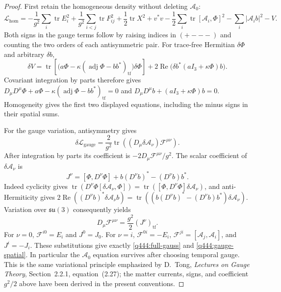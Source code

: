 \begin{proof}
First retain the homogeneous density without deleting $\mathcal A_0$:
\[
 \mathcal L_{\mathrm{hom}}
 =-\frac1{g^2}\sum_i\operatorname{tr}E_i^2
   +\frac1{g^2}\sum_{i<j}\operatorname{tr}F_{ij}^2
   +\frac12\operatorname{tr}X^2+v^*v
   -\frac12\sum_i\operatorname{tr}[\mathcal A_i,\Phi]^2
   -\sum_i|\mathcal A_i b|^2-V.
\]
Both signs in the gauge terms follow by raising indices in $(+---)$
and counting the two orders of each antisymmetric pair.
For trace-free Hermitian $\delta\Phi$ and arbitrary $\delta b$,
\[
 \delta V=
 \operatorname{tr}\!\left[
 \bigl(a\Phi-\kappa(\operatorname{adj}\Phi-bb^*)_{\mathrm{tf}}\bigr)
 \delta\Phi\right]
 +2\operatorname{Re}\bigl(\delta b^*(aI_3+\kappa\Phi)b\bigr).
\]
Covariant integration by parts therefore gives
$D_\mu D^\mu\Phi+a\Phi-
\kappa(\operatorname{adj}\Phi-bb^*)_{\mathrm{tf}}=0$ and
$D_\mu D^\mu b+(aI_3+\kappa\Phi)b=0$. Homogeneity gives the first
two displayed equations, including the minus signs in their spatial sums.

For the gauge variation, antisymmetry gives
\[
 \delta\mathcal L_{\mathrm{gauge}}
 =\frac2{g^2}\operatorname{tr}
       ((D_\mu\delta\mathcal A_\nu)\mathcal F^{\mu\nu}).
\]
After integration by parts its coefficient is
$-2D_\mu\mathcal F^{\mu\nu}/g^2$.
The scalar coefficient of $\delta\mathcal A_\nu$ is
\[
 J^\nu=[\Phi,D^\nu\Phi]
           +b(D^\nu b)^*-(D^\nu b)b^*.
\]
Indeed cyclicity gives
$\operatorname{tr}(D^\nu\Phi[\delta\mathcal A_\nu,\Phi])
=\operatorname{tr}([\Phi,D^\nu\Phi]\delta\mathcal A_\nu)$,
and anti-Hermiticity gives
$2\operatorname{Re}((D^\nu b)^*\delta\mathcal A_\nu b)
=\operatorname{tr}((b(D^\nu b)^*-(D^\nu b)b^*)\delta\mathcal A_\nu)$.
Variation over $\mathfrak{su}(3)$ consequently yields
\[
 D_\mu\mathcal F^{\mu\nu}=\frac{g^2}{2}(J^\nu)_{\mathrm{tf}}.
\]
For $\nu=0$, $\mathcal F^{i0}=E_i$ and $J^0=J_0$.
For $\nu=i$, $\mathcal F^{0i}=-E_i$,
$\mathcal F^{ji}=[\mathcal A_j,\mathcal A_i]$, and $J^i=-J_i$.
These substitutions give exactly \eqref{q444:full-gauss} and
\eqref{q444:gauge-spatial}. In particular the $\mathcal A_0$ equation
survives after choosing temporal gauge. This is the same variational
principle emphasized by D.~Tong, \emph{Lectures on Gauge Theory},
Section~2.2.1, equation~(2.27); the matter currents, signs, and coefficient
$g^2/2$ above have been derived in the present conventions.
\end{proof}

